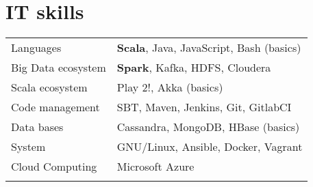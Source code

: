 \documentclass[11pt,a4paper]{moderncv}
\begin{document}
\section{IT skills}
\begin{tabular}{ll}
  \vspace{0.1cm}
  \hspace{0.1cm} Languages & \hspace{0.5cm} \textbf{Scala}, Java, JavaScript, Bash (basics) \\ \vspace{0.1cm}
  \hspace{0.1cm} Big Data ecosystem & \hspace{0.5cm} \textbf{Spark}, Kafka, HDFS, Cloudera \\ \vspace{0.1cm}
  \hspace{0.1cm} Scala ecosystem & \hspace{0.5cm} Play 2!, Akka (basics) \\ \vspace{0.1cm}
  \hspace{0.1cm} Code management & \hspace{0.5cm} SBT, Maven, Jenkins, Git, GitlabCI \\ \vspace{0.1cm}
  \hspace{0.1cm} Data bases & \hspace{0.5cm} Cassandra, MongoDB, HBase (basics) \\ \vspace{0.1cm}
  \hspace{0.1cm} System & \hspace{0.5cm} GNU/Linux, Ansible, Docker, Vagrant \\ \vspace{0.1cm}
  \hspace{0.1cm} Cloud Computing & \hspace{0.5cm} Microsoft Azure \\ \vspace{0.1cm}
\end{tabular}



\newpage
\end{document}
